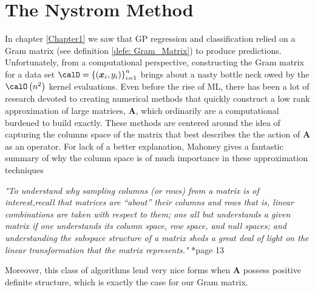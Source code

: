 \section{The Nystrom Method}\label{Chapter2}
In chapter \ref{Chapter1} we saw that GP regression and classification relied on a Gram matrix (see definition \ref{defe: Gram_Matrix}) to produce predictions. Unfortunately, from a computational perspective, constructing the Gram matrix for a data set $\calD = \left\{ \left( \bm{x}_i , y_{i} \right) \right\}_{i=1}^{n}$ brings about a nasty bottle neck owed by the $\calO \left( n^2 \right)$ kernel evaluations. Even before the rise of ML, there has been a lot of research devoted to creating numerical methods that quickly construct a low rank approximation of large matrices, $\bm{A}$, which ordinarily are a computational burdened to build exactly. These methods are centered around the idea of capturing the columns space of the matrix that best describes the the action of $\bm{A}$ as an operator. For lack of a better explanation, Mahoney gives a fantastic summary of why the column space is of much importance in these approximation techniques
\begin{center}
    \emph{"To understand why sampling columns (or rows) from a matrix is of interest,recall that matrices are “about” their columns and rows that is, linear combinations are taken with respect to them; one all but understands a given matrix if one understands its column space, row space, and null
        spaces; and understanding the subspace structure of a matrix sheds a great deal of light on the linear transformation that the matrix represents."} \cite{DBLP:journals/corr/abs-1104-5557}*{page 13}
\end{center}
Moreover, this class of algorithms lend very nice forms when $\bm{A}$ possess positive definite structure, which is exactly the case for our Gram matrix.

